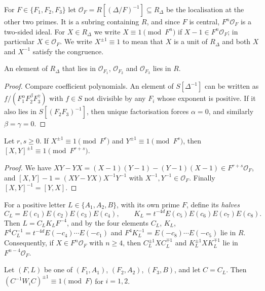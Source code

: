 \documentclass[11pt,colorlinks]{charlie}
\begin{document}
For $F\in\{F_1,F_2,F_3\}$ let $\mathcal O_F=R[(\Delta/F)^{-1}]\subseteq R_\Delta$ be the localisation at the other two primes. It is a subring containing $R$, and since $F$ is central, $F^n\mathcal O_F$ is a two-sided ideal. For $X\in R_\Delta$ we write $X\equiv1\pmod{F^n}$ if $X-1\in F^n\mathcal O_F$; in particular $X\in\mathcal O_F$. We write $X^{\pm1}\equiv1$ to mean that $X$ is a unit of $R_\Delta$ and both $X$ and $X^{-1}$ satisfy the congruence.

\begin{lemma}\label{lem:local}
An element of $R_\Delta$ that lies in $\mathcal O_{F_1}$, $\mathcal O_{F_2}$ and $\mathcal O_{F_3}$ lies in $R$.
\end{lemma}

\begin{proof}
Compare coefficient polynomials. An element of $S[\Delta^{-1}]$ can be written as $f/(F_1^{\alpha}F_2^{\beta}F_3^{\gamma})$ with $f\in S$ not divisible by any $F_i$ whose exponent is positive. If it also lies in $S[(F_2F_3)^{-1}]$, then unique factorisation forces $\alpha=0$, and similarly $\beta=\gamma=0$.
\end{proof}

\begin{lemma}\label{lem:commutator}
Let $r,s\ge0$. If $X^{\pm1}\equiv1\pmod{F^r}$ and $Y^{\pm1}\equiv1\pmod{F^s}$, then $[X,Y]^{\pm1}\equiv1\pmod{F^{r+s}}$.
\end{lemma}

\begin{proof}
We have $XY-YX=(X-1)(Y-1)-(Y-1)(X-1)\in F^{r+s}\mathcal O_F$, and $[X,Y]-1=(XY-YX)X^{-1}Y^{-1}$ with $X^{-1},Y^{-1}\in\mathcal O_F$. Finally $[X,Y]^{-1}=[Y,X]$.
\end{proof}

For a positive letter $L\in\{A_1,A_2,B\}$, with its own prime $F$, define its \emph{halves}
\[
  C_L=E(c_1)E(c_2)E(c_3)E(c_4),\qquad K_L=t^{-4d}E(c_5)E(c_6)E(c_7)E(c_8).
\]
Then $L=C_LK_LF^{-4}$, and by  the four elements $C_L$, $K_L$, $F^4C_L^{-1}=t^{-4d}E(-c_4)\cdots E(-c_1)$ and $F^4K_L^{-1}=E(-c_8)\cdots E(-c_5)$ lie in $R$. Consequently, if $X\in F^n\mathcal O_F$ with $n\ge4$, then $C_L^{\pm1}XC_L^{\mp1}$ and $K_L^{\pm1}XK_L^{\mp1}$ lie in $F^{n-4}\mathcal O_F$.

\begin{lemma}\label{lem:W}
Let $(F,L)$ be one of $(F_1,A_1)$, $(F_2,A_2)$, $(F_3,B)$, and let $C=C_L$. Then $(C^{-1}W_iC)^{\pm1}\equiv1\pmod F$ for $i=1,2$.
\end{lemma}
\end{document}
